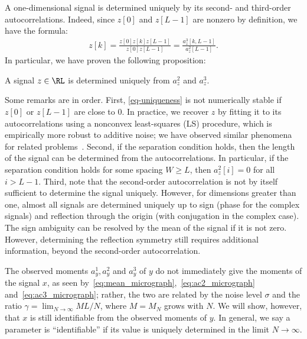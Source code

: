 \documentclass[9pt,twocolumn,twoside,lineno]{pnas-new}
\begin{document}
A one-dimensional signal is determined uniquely by its second- and third-order autocorrelations. Indeed, since $z[0]$ and $z[L-1]$ are nonzero by definition, we have the formula:
%
\begin{align} \label{eq-uniqueness}
%
z[k] = \frac{z[0]z[k]z[L-1]}{z[0]z[L-1]} = \frac{a_z^3[k,L-1]}{a_z^2[L-1]}.
%
\end{align}
In particular, we have proven the following proposition:
\begin{proposition} \label{prop:uniqueness}
	 A signal $z\in\RL$ is determined uniquely from  $a_z^2$ and $a_z^3$.
\end{proposition}

Some remarks are in order. First, \eqref{eq-uniqueness} is not numerically stable if $z[0]$ or $z[L-1]$ are close to 0. In practice, we recover $z$ by fitting it to its autocorrelations using a nonconvex least-squares (LS) procedure, which is empirically more robust to additive noise; we have observed similar phenomena for related problems~\cite{bendory2017bispectrum,boumal2017heterogeneous,abbe2017multireference}.
Second, if the separation condition holds, then the length of the signal can be determined from the autocorrelations.
In particular, if the separation condition holds for some spacing $W\geq L$, then $a_z^2[i]=0$ for all $i>L-1$.
Third, note that the second-order autocorrelation is not by itself sufficient to determine the signal uniquely. %
However, for dimensions greater than one, almost all signals are determined uniquely up to sign (phase for the complex signals) and reflection through the origin (with conjugation in the complex case). %
The sign ambiguity can be resolved by the mean of the signal if it is not zero. However, determining the reflection symmetry still requires additional information, beyond the second-order autocorrelation.

The observed moments $a_y^1,a_y^2$ and $a_y^3$ of $y$ do not immediately give the moments of the signal $x$, as seen by~\eqref{eq:mean_micrograph},~\eqref{eq:ac2_micrograph} and~\eqref{eq:ac3_micrograph}; rather, the two are related by the noise level $\sigma$ and the ratio $\gamma = \lim_{N\to\infty}ML/N$,  where $M=M_N$ grows with $N$. We will show, however, that $x$ is still identifiable from the observed moments of $y$. In general, we say a parameter is ``identifiable'' if its value is uniquely determined in the limit $N \to \infty$.
\end{document}
